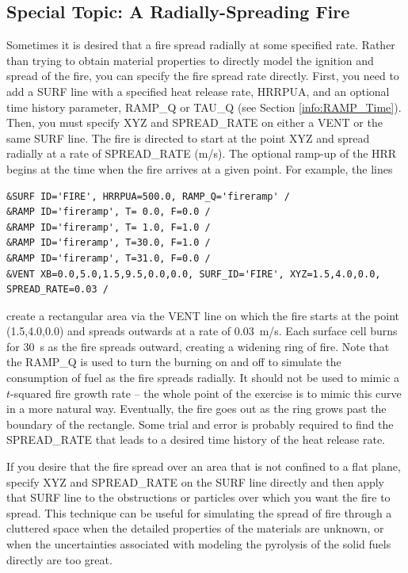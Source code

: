 \documentclass[11pt]{book}
\begin{document}
\subsection{Special Topic: A Radially-Spreading Fire}
\label{info:spread}

Sometimes it is desired that a fire spread radially at some specified rate. Rather than trying to obtain material properties to directly model the ignition and spread of the fire, you can specify the fire spread rate directly. First, you need to add a {\ct SURF} line with a specified heat release rate, {\ct HRRPUA}, and an optional time history parameter, {\ct RAMP\_Q} or {\ct TAU\_Q} (see Section \ref{info:RAMP_Time}). Then, you must specify {\ct XYZ} and {\ct SPREAD\_RATE} on either a {\ct VENT} or the same {\ct SURF} line. The fire is directed to start at the point {\ct XYZ} and spread radially at a rate of {\ct SPREAD\_RATE} (m/s). The optional ramp-up of the HRR begins at the time when the fire arrives at a given point. For example, the lines
\begin{lstlisting}
&SURF ID='FIRE', HRRPUA=500.0, RAMP_Q='fireramp' /
&RAMP ID='fireramp', T= 0.0, F=0.0 /
&RAMP ID='fireramp', T= 1.0, F=1.0 /
&RAMP ID='fireramp', T=30.0, F=1.0 /
&RAMP ID='fireramp', T=31.0, F=0.0 /
&VENT XB=0.0,5.0,1.5,9.5,0.0,0.0, SURF_ID='FIRE', XYZ=1.5,4.0,0.0, SPREAD_RATE=0.03 /
\end{lstlisting}
create a rectangular area via the {\ct VENT} line on which the fire starts at the point (1.5,4.0,0.0) and spreads outwards at a rate of 0.03~m/s. Each surface cell burns for 30~s as the fire spreads outward, creating a widening ring of fire. Note that the {\ct RAMP\_Q} is used to turn the burning on and off to simulate the consumption of fuel as the fire spreads radially. It should not be used to mimic a $t$-squared fire growth rate -- the whole point of the exercise is to mimic this curve in a more natural way. Eventually, the fire goes out as the ring grows past the boundary of the rectangle. Some trial and error is probably required to find the {\ct SPREAD\_RATE} that leads to a desired time history of the heat release rate.

If you desire that the fire spread over an area that is not confined to a flat plane, specify {\ct XYZ} and {\ct SPREAD\_RATE} on the {\ct SURF} line directly and then apply that {\ct SURF} line to the obstructions or particles over which you want the fire to spread. This technique can be useful for simulating the spread of fire through a cluttered space when the detailed properties of the materials are unknown, or when the uncertainties associated with modeling the pyrolysis of the solid fuels directly are too great.
\end{document}
